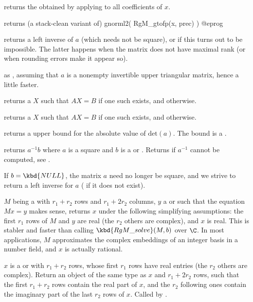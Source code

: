  returns the  obtained by
applying  to all coefficients of $x$.

 returns (a stack-clean variant of)
\bprog
  gnorml2( RgM_gtofp(x, prec) )
@eprog


 returns a left inverse of $a$ (which needs not be
square), or  if this turns out to be impossible. The latter
happens when the matrix does not have maximal rank (or when rounding errors
make it appear so).

 as , assuming that $a$ is a
nonempty invertible upper triangular matrix, hence a little faster.

 returns a  $X$ such that
$A X = B$ if one such exists, and  otherwise.

 returns a  $X$ such that
$A X = B$ if one such exists, and  otherwise.

 returns a upper bound for the absolute
value of $\text{det}(a)$. The bound is a .

 returns $a^{-1}b$ where $a$ is a square
 and $b$ is a  or . Returns  if $a^{-1}$
cannot be computed, see .

If $b = \kbd{NULL}$, the matrix $a$ need no longer be square, and we strive
to return a left inverse for $a$ ( if it does not exist).

 $M$ being a 
with $r_1+r_2$ rows and $r_1+2r_2$ columns, $y$ a  or 
such that the equation $Mx = y$ makes sense, returns $x$ under the following
simplifying assumptions: the first $r_1$ rows of $M$ and $y$ are real
(the $r_2$ others are complex), and $x$ is real. This is stabler and faster
than calling $\kbd{RgM\_solve}(M, b)$ over $\C$. In most applications,
$M$ approximates the complex embeddings of an integer basis in a number
field, and $x$ is actually rational.

 $x$ is a  or
 with $r_1 + r_2$ rows, whose first $r_1$ rows have real entries
(the $r_2$ others are complex). Return an object of the same type as
$x$ and $r_1 + 2r_2$ rows, such that the first $r_1 + r_2$ rows contain
the real part of $x$, and the $r_2$ following ones contain the imaginary part
of the last $r_2$ rows of $x$. Called by .

